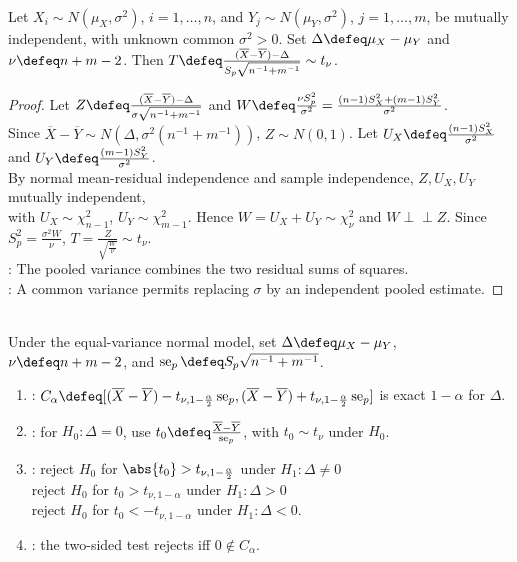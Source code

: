 \begin{theorem} \label{thm:two-sample-pooled-t-pivot} \\
Let $X_i\sim N(\mu_X,\sigma^2)$, $i=1,\ldots,n$, and $Y_j\sim N(\mu_Y,\sigma^2)$, $j=1,\ldots,m$, be mutually independent, with unknown common $\sigma^2>0$. Set $\Delta\defeq\mu_X-\mu_Y$ and $\nu\defeq n+m-2$. Then $T\defeq\frac{(\overline{X}-\overline{Y})-\Delta}{S_p\sqrt{n^{-1}+m^{-1}}}\sim t_\nu$.
\begin{proof}
Let $Z\defeq\frac{(\overline{X}-\overline{Y})-\Delta}{\sigma\sqrt{n^{-1}+m^{-1}}}$ and $W\defeq\frac{\nu S_p^2}{\sigma^2}=\frac{(n-1)S_X^2+(m-1)S_Y^2}{\sigma^2}$.\\
Since $\overline{X}-\overline{Y}\sim N(\Delta,\sigma^2(n^{-1}+m^{-1}))$, $Z\sim N(0,1)$. Let $U_X\defeq\frac{(n-1)S_X^2}{\sigma^2}$ and $U_Y\defeq\frac{(m-1)S_Y^2}{\sigma^2}$.\\
By normal mean-residual independence and sample independence, $Z,U_X,U_Y$ mutually independent,\\
with $U_X\sim\chi^2_{n-1}$, $U_Y\sim\chi^2_{m-1}$. Hence $W=U_X+U_Y\sim\chi^2_\nu$ and $W\perp\!\!\!\perp Z$. Since $S_p^2=\frac{\sigma^2W}{\nu}$, $T=\frac{Z}{\sqrt{\frac{W}{\nu}}}\sim t_\nu$.\\
: The pooled variance combines the two residual sums of squares.\\
: A common variance permits replacing $\sigma$ by an independent pooled estimate.
\end{proof}
\end{theorem}

\begin{method} \label{meth:pooled-two-sample-t-interval-and-tests} \\
Under the equal-variance normal model, set $\Delta\defeq\mu_X-\mu_Y$, $\nu\defeq n+m-2$, and $\operatorname{se}_p\defeq S_p\sqrt{n^{-1}+m^{-1}}$.
\begin{enumerate}[label=(\roman*)]
\setlength{\itemsep}{0pt}
\item {}: $C_\alpha\defeq[(\overline{X}-\overline{Y})-t_{\nu,1-\frac{\alpha}{2}}\operatorname{se}_p,(\overline{X}-\overline{Y})+t_{\nu,1-\frac{\alpha}{2}}\operatorname{se}_p]$ is exact $1-\alpha$ for $\Delta$.
\item {}: for $H_0:\Delta=0$, use $t_0\defeq\frac{\overline{X}-\overline{Y}}{\operatorname{se}_p}$, with $t_0\sim t_\nu$ under $H_0$.
\item {}: reject $H_0$ for $\abs{t_0}>t_{\nu,1-\frac{\alpha}{2}}$ under $H_1:\Delta\neq0$\\
reject $H_0$ for $t_0>t_{\nu,1-\alpha}$ under $H_1:\Delta>0$\\
reject $H_0$ for $t_0<-t_{\nu,1-\alpha}$ under $H_1:\Delta<0$.
\item {}: the two-sided test rejects iff $0\notin C_\alpha$.
\end{enumerate}
\end{method}

